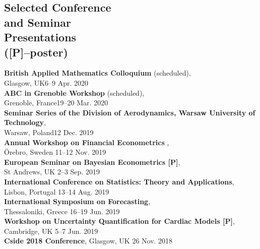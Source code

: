 \documentclass[margin,line]{resume}
\begin{document}
\begin{resume}
\vspace{-2mm}

\section{\mysidestyle Selected Conference \\and Seminar \\Presentations \\ ([P]--poster)} 
	\textbf{British Applied Mathematics Colloquium} (scheduled),\\
	Glasgow, UK\hfill  6--9 Apr. 2020 \vspace{1mm} \\
	\textbf{ABC in Grenoble Workshop} (scheduled),\\
	Grenoble, France\hfill  19--20 Mar. 2020 \vspace{1mm} \\	
	\textbf{Seminar Series of the Division of Aerodynamics, Warsaw University of Technology},\\
	Warsaw, Poland\hfill 12 Dec. 2019 \vspace{1mm} \\
	\textbf{ Annual Workshop on Financial Econometrics },\\
	{\"O}rebro, Sweden \hfill 11--12 Nov. 2019 \vspace{1mm} \\
	\textbf{ European Seminar on Bayesian Econometrics [P]},\\
	St Andrews, UK \hfill 2--3 Sep. 2019 \vspace{1mm} \\
	\textbf{International Conference on Statistics: Theory and Applications},\\
	Lisbon, Portugal \hfill 13--14 Aug. 2019 \vspace{1mm} \\		
	\textbf{ International Symposium on Forecasting},\\
	Thessaloniki, Greece \hfill 16--19 Jun. 2019 \vspace{1mm} \\	
	\textbf{Workshop on Uncertainty Quantification for Cardiac Models [P]},\\
	Cambridge, UK \hfill 5--7 Jun. 2019 \vspace{1mm} \\		
	\textbf{Cside 2018 Conference}, Glasgow, UK \hfill 26 Nov. 2018 \vspace{1mm} \\

\end{resume}
\end{document}
